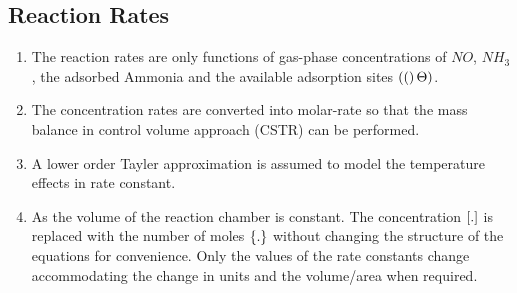 \subsection{Reaction Rates}
\begin{enumerate}
\item The reaction rates are only functions of gas-phase concentrations of $NO$,
$NH_3$, the adsorbed Ammonia and the available adsorption sites $\left( ( \right)\Theta)$.

\item The concentration rates are converted into molar-rate so that the
mass balance in control volume approach (CSTR) can be performed.

\item A lower order Tayler approximation is assumed to model the temperature
effects in rate constant.

\item As the volume of the reaction chamber is constant. The concentration
    $\left[ . \right]$ is replaced with the number of moles $\left\{ . \right\}$ without changing
        the structure of the equations for convenience. Only the values of the
        rate constants change accommodating the change in units and the
        volume/area when required.
\end{enumerate}

